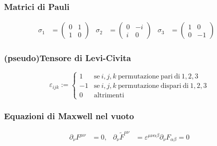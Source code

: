 \subsubsection{Matrici di Pauli}
\begin{equation}\label{eq:paulimatrix}
   \begin{aligned}
      \sigma_1 &= \begin{pmatrix} 0 & 1  \\ 1 & 0  \end{pmatrix}&
      \sigma_2 &= \begin{pmatrix} 0 & -i \\ i & 0  \end{pmatrix}&
      \sigma_3 &= \begin{pmatrix} 1 & 0  \\ 0 & -1 \end{pmatrix}&
   \end{aligned}
\end{equation}
\subsubsection{(pseudo)Tensore di Levi-Civita}
$$
   \varepsilon_{ijk} := \begin{cases}
      1  & \mathrm{se \:} i,j,k \mathrm{\: permutazione \:   pari \: di\:} 1,2,3 \\
      -1 & \mathrm{se \:} i,j,k \mathrm{\: permutazione \: dispari\: di\:} 1,2,3 \\
      0  & \mathrm{altrimenti}
   \end{cases}
$$

\subsubsection{Equazioni di Maxwell nel vuoto}
\begin{equation}
   \begin{aligned}
      \partial _\nu F^{\mu\nu} & = 0 ,&
      \partial _\nu \tilde{F}^{\mu\nu}
         & =  \varepsilon^{\mu\nu\alpha\beta} \partial _\nu F_{\alpha\beta}
         = 0
   \end{aligned}
\end{equation}

